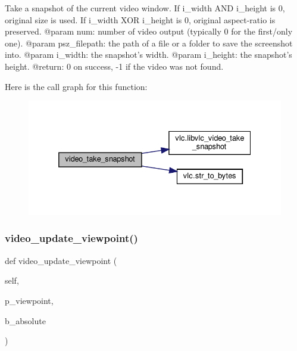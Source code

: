 \begin{DoxyVerb}Take a snapshot of the current video window.
If i_width AND i_height is 0, original size is used.
If i_width XOR i_height is 0, original aspect-ratio is preserved.
@param num: number of video output (typically 0 for the first/only one).
@param psz_filepath: the path of a file or a folder to save the screenshot into.
@param i_width: the snapshot's width.
@param i_height: the snapshot's height.
@return: 0 on success, -1 if the video was not found.
\end{DoxyVerb}
 Here is the call graph for this function\+:
\nopagebreak
\begin{figure}[H]
\begin{center}
\leavevmode
\includegraphics[width=332pt]{classvlc_1_1_media_player_aa8c63c57da5e893491429ce65cb18c02_cgraph}
\end{center}
\end{figure}
\mbox{\label{classvlc_1_1_media_player_ad248ed33e6ee4b9f0de5627464010857}} 
\subsubsection{\texorpdfstring{video\+\_\+update\+\_\+viewpoint()}{video\_update\_viewpoint()}}
{\footnotesize\ttfamily def video\+\_\+update\+\_\+viewpoint (\begin{DoxyParamCaption}\item[{}]{self,  }\item[{}]{p\+\_\+viewpoint,  }\item[{}]{b\+\_\+absolute }\end{DoxyParamCaption})}

